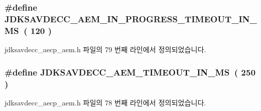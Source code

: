 \subsubsection[{\texorpdfstring{J\+D\+K\+S\+A\+V\+D\+E\+C\+C\+\_\+\+A\+E\+M\+\_\+\+I\+N\+\_\+\+P\+R\+O\+G\+R\+E\+S\+S\+\_\+\+T\+I\+M\+E\+O\+U\+T\+\_\+\+I\+N\+\_\+\+MS}{JDKSAVDECC_AEM_IN_PROGRESS_TIMEOUT_IN_MS}}]{\setlength{\rightskip}{0pt plus 5cm}\#define J\+D\+K\+S\+A\+V\+D\+E\+C\+C\+\_\+\+A\+E\+M\+\_\+\+I\+N\+\_\+\+P\+R\+O\+G\+R\+E\+S\+S\+\_\+\+T\+I\+M\+E\+O\+U\+T\+\_\+\+I\+N\+\_\+\+MS~( 120 )}\hypertarget{group__aecpdu__aem__timeouts_ga44751a50fba887be8b796a75eb18766a}{}\label{group__aecpdu__aem__timeouts_ga44751a50fba887be8b796a75eb18766a}


jdksavdecc\+\_\+aecp\+\_\+aem.\+h 파일의 79 번째 라인에서 정의되었습니다.

\subsubsection[{\texorpdfstring{J\+D\+K\+S\+A\+V\+D\+E\+C\+C\+\_\+\+A\+E\+M\+\_\+\+T\+I\+M\+E\+O\+U\+T\+\_\+\+I\+N\+\_\+\+MS}{JDKSAVDECC_AEM_TIMEOUT_IN_MS}}]{\setlength{\rightskip}{0pt plus 5cm}\#define J\+D\+K\+S\+A\+V\+D\+E\+C\+C\+\_\+\+A\+E\+M\+\_\+\+T\+I\+M\+E\+O\+U\+T\+\_\+\+I\+N\+\_\+\+MS~( 250 )}\hypertarget{group__aecpdu__aem__timeouts_gaa18161e92bdd9e1798491c2e3cea2417}{}\label{group__aecpdu__aem__timeouts_gaa18161e92bdd9e1798491c2e3cea2417}


jdksavdecc\+\_\+aecp\+\_\+aem.\+h 파일의 78 번째 라인에서 정의되었습니다.

